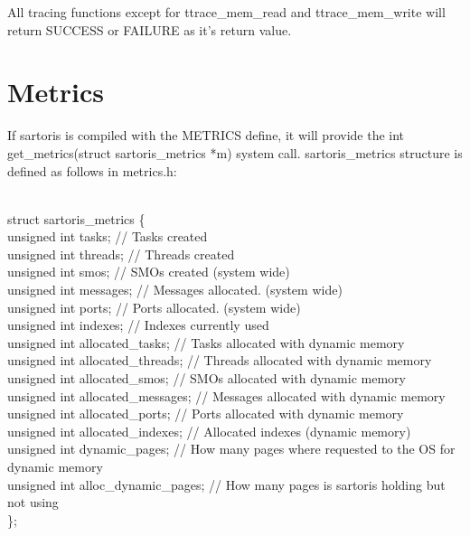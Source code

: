 \documentclass[11pt, letterpaper, twoside, english]{book}
\begin{document}
All tracing functions except for \textsf{ttrace\_mem\_read} and \textsf{ttrace\_mem\_write} will return SUCCESS or FAILURE as it's return value.

\section{Metrics} \label{sec:metrics}

If sartoris is compiled with the METRICS define, it will provide the \textsf{int get\_metrics(struct sartoris\_metrics *m)} system call. \textsf{sartoris\_metrics} structure is defined as follows in \textsf{metrics.h}:\\
\\
\begin{sf} \noindent struct sartoris\_metrics \{ \\
\indent unsigned int tasks;                 // Tasks created\\
\indent unsigned int threads;               // Threads created\\
\indent unsigned int smos;									// SMOs created (system wide)\\
\indent unsigned int messages;							// Messages allocated. (system wide)\\
\indent unsigned int ports;									// Ports allocated. (system wide)\\
\indent unsigned int indexes;               // Indexes currently used\\
\indent unsigned int allocated\_tasks;       // Tasks allocated with dynamic memory\\
\indent unsigned int allocated\_threads;     // Threads allocated with dynamic memory\\
\indent unsigned int allocated\_smos;        // SMOs allocated with dynamic memory\\
\indent unsigned int allocated\_messages;    // Messages allocated with dynamic memory\\
\indent unsigned int allocated\_ports;       // Ports allocated with dynamic memory\\
\indent unsigned int allocated\_indexes;     // Allocated indexes (dynamic memory)\\
\indent unsigned int dynamic\_pages;         // How many pages where requested to the OS for dynamic memory\\
\indent unsigned int alloc\_dynamic\_pages;   // How many pages is sartoris holding but not using\\\}; \\
\end{sf}
\\
\end{document}
